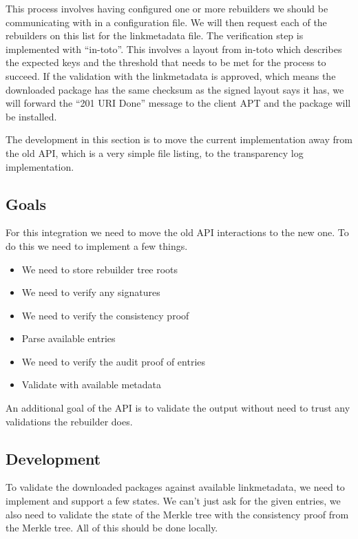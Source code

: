 \documentclass[../Main/thesis.tex]{subfiles}
\begin{document}
This process involves having configured one or more rebuilders we should be
communicating with in a configuration file. We will then request each of the
rebuilders on this list for the linkmetadata file. The verification step is
implemented with ``in-toto''. This involves a layout from in-toto which
describes the expected keys and the threshold that needs to be met for the
process to succeed. If the validation with the linkmetadata is approved, which
means the downloaded package has the same checksum as the signed layout says it
has, we will forward the ``201 URI Done'' message to the client APT and the
package will be installed.

The development in this section is to move the current implementation away from
the old API, which is a very simple file listing, to the transparency log
implementation.


\subsection*{Goals}%
\label{sub:apt_transport_goals}
For this integration we need to move the old API interactions to the new one. To
do this we need to implement a few things.

\begin{itemize}
    \item We need to store rebuilder tree roots
    \item We need to verify any signatures
    \item We need to verify the consistency proof
    \item Parse available entries
    \item We need to verify the audit proof of entries
    \item Validate with available metadata
\end{itemize}

An additional goal of the API is to validate the output without need to trust
any validations the rebuilder does.

\subsection*{Development}%
\label{sub:apt_transport_development}
To validate the downloaded packages against available linkmetadata, we need to
implement and support a few states. We can't just ask for the given entries, we
also need to validate the state of the Merkle tree with the consistency proof
from the Merkle tree. All of this should be done locally.
\end{document}
